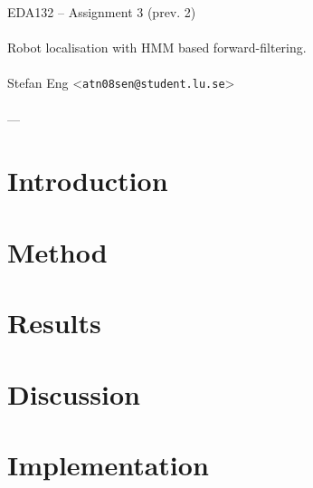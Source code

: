 \documentclass{article}
\begin{document}
  \begin{center}
    EDA132 -- Assignment 3 (prev. 2)\\
    \ \\
    {\Large Robot localisation with HMM based forward-filtering.} \\
    \ \\
    Stefan Eng <\texttt{atn08sen@student.lu.se}> \\
    \ \\
    ---
  \end{center}
  \vspace{-0.8cm}
  \section*{Introduction}
  \section*{Method}
  \section*{Results}
  \section*{Discussion}
  \section*{Implementation}
\end{document}

